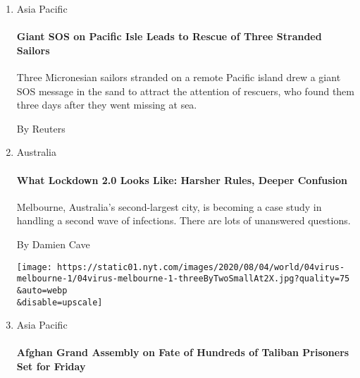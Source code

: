 \begin{enumerate}
\def\labelenumi{\arabic{enumi}.}
\item
  Asia Pacific

  \href{/reuters/2020/08/04/world/asia/04reuters-australia-sailors-sos.html?searchResultPosition=1}{}

  \hypertarget{giant-sos-on-pacific-isle-leads-to-rescue-of-three-stranded-sailors}{%
  \paragraph{Giant SOS on Pacific Isle Leads to Rescue of Three Stranded
  Sailors}\label{giant-sos-on-pacific-isle-leads-to-rescue-of-three-stranded-sailors}}

  Three Micronesian sailors stranded on a remote Pacific island drew a
  giant SOS message in the sand to attract the attention of rescuers,
  who found them three days after they went missing at sea.

  By Reuters
\item
  Australia

  \href{/2020/08/04/world/australia/coronavirus-melbourne-lockdown.html?searchResultPosition=2}{}

  \hypertarget{what-lockdown-20-looks-like-harsher-rules-deeper-confusion}{%
  \paragraph{What Lockdown 2.0 Looks Like: Harsher Rules, Deeper
  Confusion}\label{what-lockdown-20-looks-like-harsher-rules-deeper-confusion}}

  Melbourne, Australia's second-largest city, is becoming a case study
  in handling a second wave of infections. There are lots of unanswered
  questions.

  By Damien Cave

  \texttt{[image: https://static01.nyt.com/images/2020/08/04/world/04virus-melbourne-1/04virus-melbourne-1-threeByTwoSmallAt2X.jpg?quality=75\\\&auto=webp\\\&disable=upscale]}
\item
  Asia Pacific

  \href{/reuters/2020/08/04/world/asia/04reuters-afghanistan-jirga.html?searchResultPosition=3}{}

  \hypertarget{afghan-grand-assembly-on-fate-of-hundreds-of-taliban-prisoners-set-for-friday}{%
  \paragraph{Afghan Grand Assembly on Fate of Hundreds of Taliban
  Prisoners Set for
  Friday}\label{afghan-grand-assembly-on-fate-of-hundreds-of-taliban-prisoners-set-for-friday}}


\end{enumerate}
